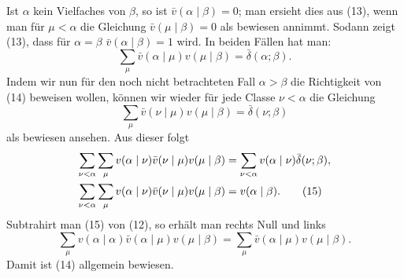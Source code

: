 \documentclass[11pt,a4paper]{article}
\begin{document}
Ist $\alpha$ kein Vielfaches von $\beta$, so ist $\bar v(\alpha\mid\beta)=0$; man ersieht dies aus (13), wenn man für $\mu<\alpha$ die Gleichung $\bar v(\mu\mid\beta)=0$ als bewiesen annimmt. Sodann zeigt (13), dass für $\alpha=\beta$ $\bar v(\alpha\mid\beta)=1$ wird. In beiden Fällen hat man:
\begin{equation}
 \sum_\mu\bar v(\alpha\mid\mu)v(\mu\mid\beta)=\bar\delta(\alpha;\beta).
\tag{14}
\end{equation}
Indem wir nun für den noch nicht betrachteten Fall $\alpha>\beta$ die Richtigkeit von (14) beweisen wollen, können wir wieder für jede Classe $\nu<\alpha$ die Gleichung
\[
 \sum_\mu\bar v(\nu\mid\mu)v(\mu\mid\beta)=\bar\delta(\nu;\beta)
\]
als bewiesen ansehen. Aus dieser folgt
\begin{align}
\sum_{\nu<\alpha}\sum_\mu v(\alpha\mid\nu)\bar v(\nu\mid\mu)v(\mu\mid\beta)
 &=\sum_{\nu<\alpha}v(\alpha\mid\nu)\bar\delta(\nu;\beta),\notag\\
\sum_{\nu<\alpha}\sum_\mu v(\alpha\mid\nu)\bar v(\nu\mid\mu)v(\mu\mid\beta)&=v(\alpha\mid\beta).
\tag{15}
\end{align}
Subtrahirt man (15) von (12), so erhält man rechts Null und links
\[
 \sum_\mu v(\alpha\mid\alpha)\bar v(\alpha\mid\mu)v(\mu\mid\beta)
 =\sum_\mu\bar v(\alpha\mid\mu)v(\mu\mid\beta).
\]
Damit ist (14) allgemein bewiesen.
\end{document}
